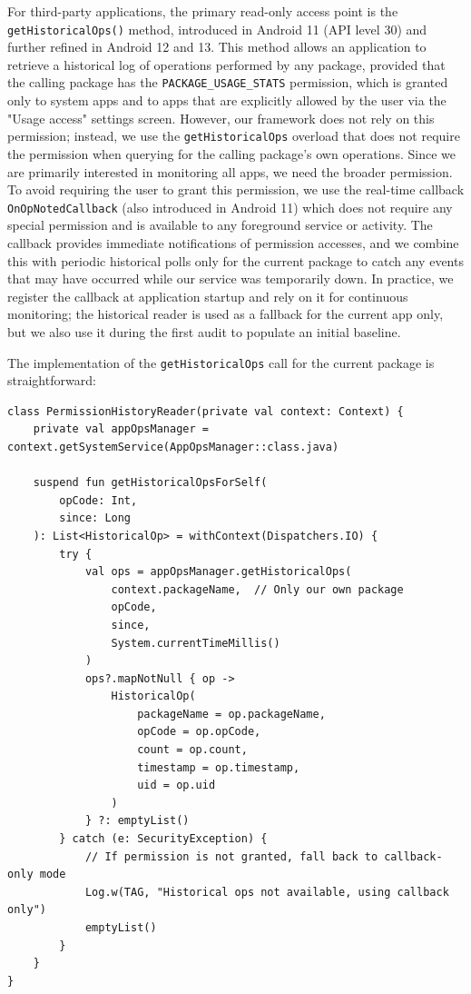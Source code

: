 For third-party applications, the primary read-only access point is the \texttt{getHistoricalOps()} method, introduced in Android 11 (API level 30) and further refined in Android 12 and 13. This method allows an application to retrieve a historical log of operations performed by any package, provided that the calling package has the \texttt{PACKAGE\_USAGE\_STATS} permission, which is granted only to system apps and to apps that are explicitly allowed by the user via the "Usage access" settings screen. However, our framework does not rely on this permission; instead, we use the \texttt{getHistoricalOps} overload that does not require the permission when querying for the calling package's own operations. Since we are primarily interested in monitoring all apps, we need the broader permission. To avoid requiring the user to grant this permission, we use the real-time callback \texttt{OnOpNotedCallback} (also introduced in Android 11) which does not require any special permission and is available to any foreground service or activity. The callback provides immediate notifications of permission accesses, and we combine this with periodic historical polls only for the current package to catch any events that may have occurred while our service was temporarily down. In practice, we register the callback at application startup and rely on it for continuous monitoring; the historical reader is used as a fallback for the current app only, but we also use it during the first audit to populate an initial baseline.

The implementation of the \texttt{getHistoricalOps} call for the current package is straightforward:

\begin{lstlisting}[caption=Historical permission reader with fallback logic]
class PermissionHistoryReader(private val context: Context) {
    private val appOpsManager = context.getSystemService(AppOpsManager::class.java)
    
    suspend fun getHistoricalOpsForSelf(
        opCode: Int, 
        since: Long
    ): List<HistoricalOp> = withContext(Dispatchers.IO) {
        try {
            val ops = appOpsManager.getHistoricalOps(
                context.packageName,  // Only our own package
                opCode,
                since,
                System.currentTimeMillis()
            )
            ops?.mapNotNull { op ->
                HistoricalOp(
                    packageName = op.packageName,
                    opCode = op.opCode,
                    count = op.count,
                    timestamp = op.timestamp,
                    uid = op.uid
                )
            } ?: emptyList()
        } catch (e: SecurityException) {
            // If permission is not granted, fall back to callback-only mode
            Log.w(TAG, "Historical ops not available, using callback only")
            emptyList()
        }
    }
}
\end{lstlisting}

